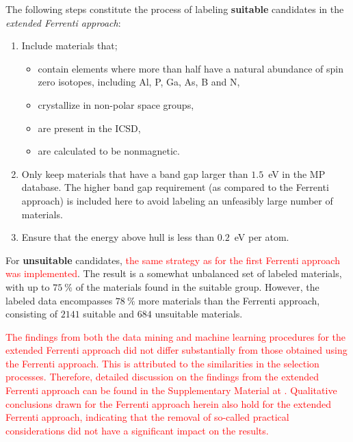 \documentclass[superscriptaddress,unsortedaddress,
 amsmath,amssymb,
 aps,
]{revtex4-2}
\newcommand{\mrk}[1]{\textcolor{red}{#1}}
\begin{document}
The following steps constitute the process of labeling \textbf{suitable} candidates in the \emph{extended Ferrenti approach}:
\begin{enumerate}
    \item Include materials that; 
    \begin{itemize}
        \item contain elements where more than half have a natural abundance of spin zero isotopes, including Al, P, Ga, As, B and N, 
        \item crystallize in non-polar space groups,
        \item are present in the ICSD,
        \item are calculated to be nonmagnetic. 
    \end{itemize}
    \item Only keep materials that have a band gap larger than $1.5$~eV in the MP database. The higher band gap requirement (as compared to the Ferrenti approach) is included here to avoid labeling an unfeasibly large number of materials. 
    \item Ensure that the energy above hull is less than $0.2$~eV per atom. 
\end{enumerate}

For \textbf{unsuitable} candidates, \mrk{the same strategy as for the first Ferrenti approach was implemented}. The result is a somewhat unbalanced set of labeled materials, with up to $75 \ \%$ of the materials found in the suitable group. However, the labeled data encompasses $78 \ \%$ more materials than  the Ferrenti approach, consisting of $2141$ suitable and $684$ unsuitable materials.

\mrk{The findings from both the data mining and machine learning procedures for the extended Ferrenti approach did not differ substantially from those obtained using the Ferrenti approach. This is attributed to the similarities in the selection processes. Therefore, detailed discussion on the findings from the extended Ferrenti approach can be found in the Supplementary Material at \cite{supplementary}. Qualitative conclusions drawn for the Ferrenti approach herein also hold for the extended Ferrenti approach, indicating that the removal of so-called practical considerations did not have a significant impact on the results. }
\end{document}
